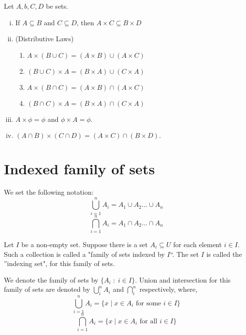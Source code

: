 \documentclass[a4paper,english,12pt]{article}
\begin{document}
\begin{thm}
 Let $A, b, C, D$ be sets.
 \begin{enumerate}[i)]
  \item If $A \subseteq B$ and $C \subseteq D$, then $A \times C \subseteq B \times D$
  \item (Distributive Laws)
  \begin{enumerate}
   \item $A \times (B \cup C) = (A \times B) \cup (A \times C)$ 
   \item $(B \cup C) \times A = (B \times A) \cup (C \times A)$
   \item $A \times (B \cap C) = (A \times B) \cap (A \times C)$
   \item $(B \cap C) \times A = (B \times A) \cap (C \times A)$
  \end{enumerate}
  \item $A \times \phi = \phi$ and $\phi \times A = \phi$.
  \item $(A \cap B) \times (C \cap D) = (A \times C) \cap (B \times D)$.
\end{enumerate}

\end{thm}

\section{Indexed family of sets}
We set the following notation:
\begin{equation*}
 \bigcup_{i = 1}^{n} A_{i} = A_{1} \cup A_{2} \dots \cup A_{n}
 \nonumber
\end{equation*}
\begin{equation*}
 \bigcap_{i = 1}^{n} A_{i} = A_{1} \cap A_{2} \dots \cap A_{n}
 \nonumber
\end{equation*}

\begin{defn}
 Let $I$ be a non-empty set. Suppose there is a set $A_{i} \subseteq U$ for each element $i \in I$. Such a collection is called a 
 "family of sets indexed by $I$``. The set $I$ is called the ''indexing set", for this family of sets. 
\end{defn}

We denote the family of sets by $\{A_{i} \;:\; i \in I\}$. Union and intersection for this family of sets are denoted by $\bigcup_{i}^{n}A_{i}$
and $\bigcap_{i}^{n}$ respectively, where,
\begin{equation*}
 \bigcup_{i = 1}^{n}A_{i} = \{x \; | \; x \in A_{i} \text{ for some } i \in I \}
 \nonumber
\end{equation*}
\begin{equation*}
 \bigcap_{i = 1}^{n}A_{i} = \{x \; | \; x \in A_{i} \text{ for all } i \in I \}
 \nonumber
\end{equation*}
\end{document}
